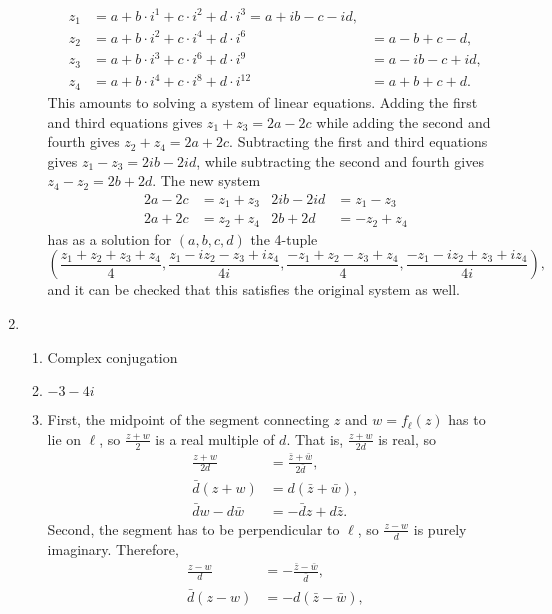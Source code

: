 \begin{enumerate}
\begin{enumerate}
\begin{align*}
z_1 &= a + b\cdot i^1 + c\cdot i^2 + d\cdot i^3 = a + ib - c - id, \\
z_2 &= a + b\cdot i^2 + c\cdot i^4 + d\cdot i^6 &= a - b + c - d, \\
z_3 &= a + b\cdot i^3 + c\cdot i^6 + d\cdot i^9 &= a - ib - c + id, \\
z_4 &= a + b\cdot i^4 + c\cdot i^8 + d\cdot i^{12} &= a + b + c + d.
\end{align*}
This amounts to solving a system of linear equations. Adding the first and third equations gives $z_1 + z_3 = 2a - 2c$ while adding the second and fourth gives $z_2 + z_4 = 2a + 2c$. Subtracting the first and third equations gives $z_1 - z_3 = 2ib - 2id$, while subtracting the second and fourth gives $z_4 - z_2 = 2b + 2d$. The new system
\begin{align*}
2a - 2c &= z_1 + z_3 & 2ib - 2id &= z_1 - z_3 \\
2a + 2c &= z_2 + z_4 & 2b + 2d &= -z_2 + z_4
\end{align*}
has as a solution for $(a,b,c,d)$ the 4-tuple
\begin{equation*}
\left(\frac{z_1 + z_2 + z_3 + z_4}{4}, \frac{z_1 - iz_2 - z_3 + iz_4}{4i}, \frac{-z_1 + z_2 - z_3 + z_4}{4}, \frac{-z_1 - iz_2 + z_3 + iz_4}{4i}\right),
\end{equation*}
and it can be checked that this satisfies the original system as well.
\end{enumerate}
\item \begin{enumerate}
\item Complex conjugation
\item $-3 - 4i$
\item First, the midpoint of the segment connecting $z$ and $w = f_{\ell}(z)$ has to lie on $\ell$, so $\frac{z + w}{2}$ is a real multiple of $d$. That is, $\frac{z + w}{2d}$ is real, so
\begin{align*}
\frac{z + w}{2d} &= \frac{\bar{z} + \bar{w}}{2\bar{d}}, \\
\bar{d}(z + w) &= d(\bar{z} + \bar{w}), \\
\bar{d}w - d\bar{w} &= -\bar{d}z + d\bar{z}. \tag{1}
\end{align*}
Second, the segment has to be perpendicular to $\ell$, so $\frac{z - w}{d}$ is purely imaginary. Therefore,
\begin{align*}
\frac{z - w}{d} &= -\frac{\bar{z} - \bar{w}}{\bar{d}}, \\
\bar{d}(z - w) &= -d(\bar{z} - \bar{w}), \\

\end{align*}
\end{enumerate}
\end{enumerate}
